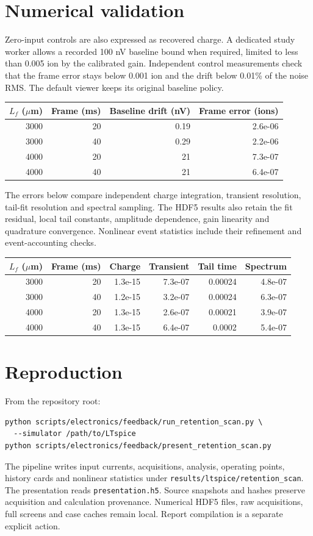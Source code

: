 \documentclass[10pt,a4paper]{article}
\begin{document}
\section{Numerical validation}
Zero-input controls are also expressed as recovered charge. A dedicated study
worker allows a recorded 100 nV baseline bound when required, limited to less
than 0.005 ion by the calibrated gain. Independent control measurements check
that the frame error stays below 0.001 ion and the drift below 0.01\% of the
noise RMS. The default viewer keeps its original baseline policy.

\begin{center}\small\begin{longtable}{rrrr}\toprule
$L_f$ ($\mu$m) & Frame (ms) & Baseline drift (nV) & Frame error (ions)\\\midrule
3000 & 20 & 0.19 & 2.6e-06 \\
3000 & 40 & 0.29 & 2.2e-06 \\
4000 & 20 & 21 & 7.3e-07 \\
4000 & 40 & 21 & 6.4e-07 \\
\bottomrule\end{longtable}\end{center}

The errors below compare independent charge integration, transient resolution,
tail-fit resolution and spectral sampling. The HDF5 results also retain the
fit residual, local tail constants, amplitude dependence, gain linearity and
quadrature convergence. Nonlinear event statistics include their refinement
and event-accounting checks.
\begin{center}\scriptsize\begin{longtable}{rrrrrr}\toprule
$L_f$ ($\mu$m) & Frame (ms) & Charge & Transient & Tail time & Spectrum\\\midrule
3000 & 20 & 1.3e-15 & 7.3e-07 & 0.00024 & 4.8e-07 \\
3000 & 40 & 1.2e-15 & 3.2e-07 & 0.00024 & 6.3e-07 \\
4000 & 20 & 1.3e-15 & 2.6e-07 & 0.00021 & 3.9e-07 \\
4000 & 40 & 1.3e-15 & 6.4e-07 & 0.0002 & 5.4e-07 \\
\bottomrule\end{longtable}\end{center}
\section{Reproduction}
From the repository root:
\begin{verbatim}
python scripts/electronics/feedback/run_retention_scan.py \
  --simulator /path/to/LTspice
python scripts/electronics/feedback/present_retention_scan.py
\end{verbatim}
The pipeline writes input currents, acquisitions, analysis, operating points,
history cards and nonlinear statistics under \texttt{results/ltspice/retention\_scan}.
The presentation reads \texttt{presentation.h5}. Source snapshots and hashes
preserve acquisition and calculation provenance. Numerical HDF5 files, raw acquisitions, full screens
and case caches remain local. Report compilation is a separate explicit action.
\end{document}
